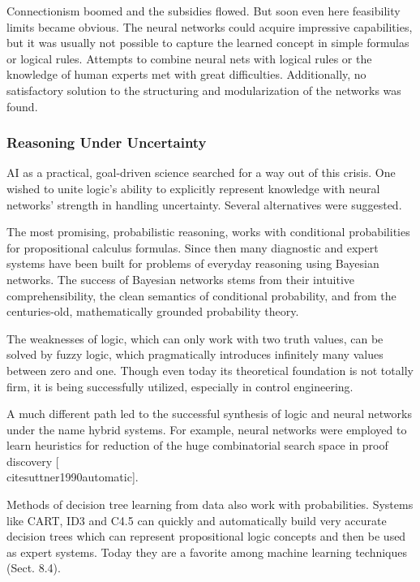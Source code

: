 \documentclass[10pt]{book}
\begin{document}
Connectionism boomed and the subsidies flowed. But soon even here feasibility limits became obvious. The neural networks could acquire impressive capabilities, but it was usually not possible to capture the learned concept in simple formulas or logical rules. Attempts to combine neural nets with logical rules or the knowledge of human experts met with great difficulties. Additionally, no satisfactory solution to the structuring and modularization of the networks was found.

\subsubsection*{Reasoning Under Uncertainty}
AI as a practical, goal-driven science searched for a way out of this crisis. One wished to unite logic's ability to explicitly represent knowledge with neural networks' strength in handling uncertainty. Several alternatives were suggested.

The most promising, probabilistic reasoning, works with conditional probabilities for propositional calculus formulas. Since then many diagnostic and expert systems have been built for problems of everyday reasoning using Bayesian\\
networks. The success of Bayesian networks stems from their intuitive comprehensibility, the clean semantics of conditional probability, and from the centuries-old, mathematically grounded probability theory.


The weaknesses of logic, which can only work with two truth values, can be solved by fuzzy logic, which pragmatically introduces infinitely many values between zero and one. Though even today its theoretical foundation is not totally firm, it is being successfully utilized, especially in control engineering.

A much different path led to the successful synthesis of logic and neural networks under the name hybrid systems. For example, neural networks were employed to learn heuristics for reduction of the huge combinatorial search space in proof discovery [\\cite{suttner1990automatic}].

Methods of decision tree learning from data also work with probabilities. Systems like CART, ID3 and C4.5 can quickly and automatically build very accurate decision trees which can represent propositional logic concepts and then be used as expert systems. Today they are a favorite among machine learning techniques (Sect. 8.4).
\end{document}
